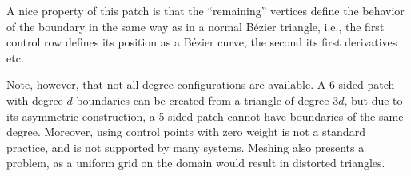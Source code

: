 \documentclass{article}
\begin{document}
A nice property of this patch is that the ``remaining'' vertices define the behavior of the
boundary in the same way as in a normal B\'ezier triangle, i.e., the first control row defines
its position as a B\'ezier curve, the second its first derivatives etc.

Note, however, that not all degree configurations are available. A 6-sided patch with degree-$d$
boundaries can be created from a triangle of degree $3d$, but due to its asymmetric construction,
a 5-sided patch cannot have boundaries of the same degree. Moreover, using control points with zero
weight is not a standard practice, and is not supported by many systems. Meshing
also presents a problem, as a uniform grid on the domain would result in distorted triangles.

\end{document}
